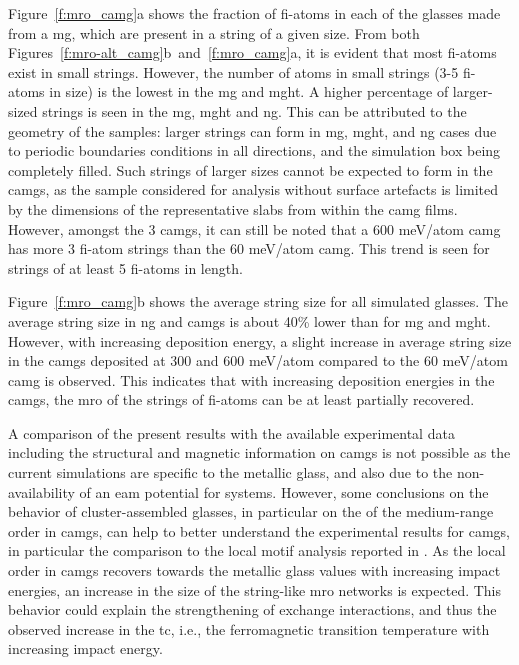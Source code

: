 \begin{changebar}
Figure~\ref{f:mro_camg}a shows the fraction of \gls{fi}-atoms in each of the glasses made from a  \gls{mg}, which are present in a string of a given size. From both Figures~\ref{f:mro-alt_camg}b~and~\ref{f:mro_camg}a, it is evident that most \gls{fi}-atoms exist in small strings. However, the number of atoms in small strings (3-5 \gls{fi}-atoms in size) is the lowest in the \gls{mg} and \gls{mght}. A higher percentage of larger-sized strings is seen in the \gls{mg}, \gls{mght} and \gls{ng}. This can be attributed to the geometry of the samples: larger strings can form in \gls{mg}, \gls{mght}, and \gls{ng} cases due to periodic boundaries conditions in all directions, and the simulation box being completely filled. Such strings of larger sizes cannot be expected to form in the \gls{camg}s, as the sample considered for analysis without surface artefacts is limited by the dimensions of the representative slabs from within the \gls{camg} films. However, amongst the 3 \gls{camg}s, it can still be noted that a 600 meV/atom \gls{camg} has more 3 \gls{fi}-atom strings than the 60 meV/atom \gls{camg}. This trend is seen for strings of at least 5 \gls{fi}-atoms in length. \par

Figure~\ref{f:mro_camg}b shows the average string size for all simulated glasses. The average string size in \gls{ng} and \gls{camg}s is about 40\% lower than for \gls{mg} and \gls{mght}. However, with increasing deposition energy, a slight increase in average string size in the \gls{camg}s deposited at 300 and 600 meV/atom compared to the 60 meV/atom \gls{camg} is observed. This indicates that with increasing deposition energies in the \gls{camg}s, the \gls{mro} of the strings of \gls{fi}-atoms can be at least partially recovered. \par

A comparison of the present results with the available experimental data including the structural and magnetic information on \fs \gls{camg}s \cite{Benel2019} is not possible as the current simulations are specific to the \cz metallic glass, and also due to the non-availability of an \gls{eam} potential for \fs systems. However, some conclusions on the behavior of cluster-assembled glasses, in particular on the of the medium-range order in \gls{camg}s, can help to better understand the experimental results for \fs \gls{camg}s, in particular the comparison to the local motif analysis reported in \cite{Benel2019}. As the local order in \gls{camg}s recovers towards the metallic glass values with increasing impact energies, an increase in the size of the string-like \gls{mro} networks is expected. This behavior could explain the strengthening of exchange interactions, and thus the observed increase in the \gls{tc}, i.e., the ferromagnetic transition temperature with increasing impact energy. \par


\end{changebar}

